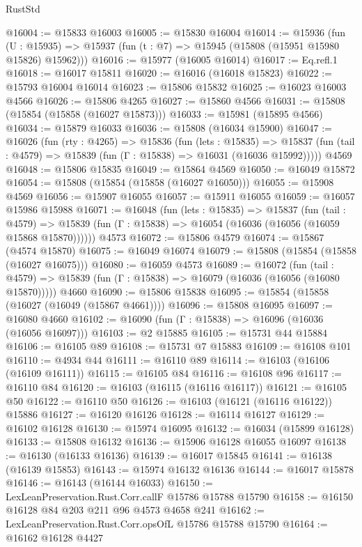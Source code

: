 \begin{lexlean}{RustStd}
\begin{coremodule}
@16004 := @15833 @16003
@16005 := @15830 @16004
@16014 := @15936
    (fun (U : @15935) => @15937 (fun (t : @7) => @15945 (@15808 (@15951 @15980 @15826) @15962)))
@16016 := @15977 (@16005 @16014)
@16017 := Eq.refl.{1}
@16018 := @16017 @15811
@16020 := @16016 (@16018 @15823)
@16022 := @15793 @16004 @16014
@16023 := @15806 @15832
@16025 := @16023 @16003 @4566
@16026 := @15806 @4265
@16027 := @15860 @4566
@16031 := @15808 (@15854 (@15858 (@16027 @15873)))
@16033 := @15981 (@15895 @4566)
@16034 := @15879 @16033
@16036 := @15808 (@16034 @15900)
@16047 := @16026
    (fun (rty : @4265) =>
    @15836
      (fun (lets : @15835) =>
      @15837 (fun (tail : @4579) => @15839 (fun (Γ : @15838) => @16031 (@16036 @15992)))))
    @4569
@16048 := @15806 @15835
@16049 := @15864 @4569
@16050 := @16049 @15872
@16054 := @15808 (@15854 (@15858 (@16027 @16050)))
@16055 := @15908 @4569
@16056 := @15907 @16055
@16057 := @15911 @16055
@16059 := @16057 @15986 @15988
@16071 := @16048
    (fun (lets : @15835) =>
    @15837
      (fun (tail : @4579) =>
      @15839 (fun (Γ : @15838) => @16054 (@16036 (@16056 (@16059 @15868 @15870))))))
    @4573
@16072 := @15806 @4579
@16074 := @15867 (@4574 @15870)
@16075 := @16049 @16074
@16079 := @15808 (@15854 (@15858 (@16027 @16075)))
@16080 := @16059 @4573
@16089 := @16072
    (fun (tail : @4579) => @15839 (fun (Γ : @15838) => @16079 (@16036 (@16056 (@16080 @15870)))))
    @4660
@16090 := @15806 @15838
@16095 := @15854 (@15858 (@16027 (@16049 (@15867 @4661))))
@16096 := @15808 @16095
@16097 := @16080 @4660
@16102 := @16090 (fun (Γ : @15838) => @16096 (@16036 (@16056 @16097)))
@16103 := @2 @15885
@16105 := @15731 @44 @15884
@16106 := @16105 @89
@16108 := @15731 @7 @15883
@16109 := @16108 @101
@16110 := @4934 @44
@16111 := @16110 @89
@16114 := @16103 (@16106 (@16109 @16111))
@16115 := @16105 @84
@16116 := @16108 @96
@16117 := @16110 @84
@16120 := @16103 (@16115 (@16116 @16117))
@16121 := @16105 @50
@16122 := @16110 @50
@16126 := @16103 (@16121 (@16116 @16122)) @15886
@16127 := @16120 @16126
@16128 := @16114 @16127
@16129 := @16102 @16128
@16130 := @15974 @16095
@16132 := @16034 (@15899 @16128)
@16133 := @15808 @16132
@16136 := @15906 @16128 @16055 @16097
@16138 := @16130 (@16133 @16136)
@16139 := @16017 @15845
@16141 := @16138 (@16139 @15853)
@16143 := @15974 @16132 @16136
@16144 := @16017 @15878
@16146 := @16143 (@16144 @16033)
@16150 := LexLeanPreservation.Rust.Corr.callF @15786 @15788 @15790
@16158 := @16150 @16128 @84 @203 @211 @96 @4573 @4658 @241
@16162 := LexLeanPreservation.Rust.Corr.opsOfL @15786 @15788 @15790
@16164 := @16162 @16128 @4427

\end{coremodule}
\end{lexlean}
